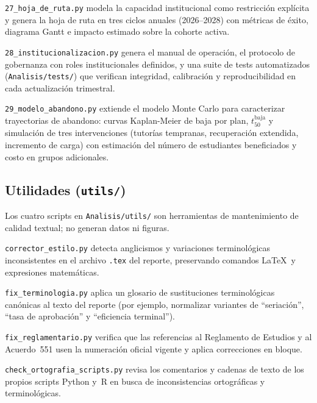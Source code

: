 \documentclass[11pt,letterpaper]{article}
\begin{document}
\begin{sloppypar}
\texttt{27\_hoja\_de\_ruta.py}
modela la capacidad institucional como restricción explícita y genera la hoja
de ruta en tres ciclos anuales (2026--2028) con métricas de éxito, diagrama
Gantt e impacto estimado sobre la cohorte activa.

\texttt{28\_institucionalizacion.py}
genera el manual de operación, el protocolo de gobernanza con roles
institucionales definidos, y una suite de tests automatizados
(\texttt{Analisis/tests/}) que verifican integridad, calibración y
reproducibilidad en cada actualización trimestral.

\texttt{29\_modelo\_abandono.py}
extiende el modelo Monte Carlo para caracterizar trayectorias de abandono:
curvas Kaplan-Meier de baja por plan, $t_{50}^{\mathrm{baja}}$ y simulación
de tres intervenciones (tutorías tempranas, recuperación extendida, incremento
de carga) con estimación del número de estudiantes beneficiados y costo
en grupos adicionales.

\subsection{Utilidades (\texttt{utils/})}

Los cuatro scripts en \texttt{Analisis/utils/} son herramientas de
mantenimiento de calidad textual; no generan datos ni figuras.

\texttt{corrector\_estilo.py}
detecta anglicismos y variaciones terminológicas inconsistentes en el
archivo \texttt{.tex} del reporte, preservando comandos \LaTeX\ y
expresiones matemáticas.

\texttt{fix\_terminologia.py}
aplica un glosario de sustituciones terminológicas canónicas al texto
del reporte (por ejemplo, normalizar variantes de ``seriación'',
``tasa de aprobación'' y ``eficiencia terminal'').

\texttt{fix\_reglamentario.py}
verifica que las referencias al Reglamento de Estudios y al Acuerdo~551
usen la numeración oficial vigente y aplica correcciones en bloque.

\texttt{check\_ortografia\_scripts.py}
revisa los comentarios y cadenas de texto de los propios scripts Python
y~R en busca de inconsistencias ortográficas y terminológicas.
\end{sloppypar}
\end{document}
